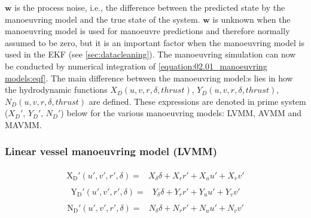 \(\mathbf{w}\) is the process noise, i.e., the difference between the predicted state by the manoeuvring model and the true
state of the system. \(\mathbf{w}\) is unknown when the manoeuvring model is used for manoeuvre predictions and therefore normally
assumed to be zero, but it is an important factor when the manoeuvring model is used in the EKF (see \autoref{sec:datacleaning}).
The manoeuvring simulation can now be conducted by numerical integration of \autoref{equation:02.01_manoeuvring models:eqf}. The main difference between the manoeuvring model:s lies in how the hydrodynamic functions \(X_D(u,v,r,\delta,thrust)\), \(Y_D(u,v,r,\delta,thrust)\), \(N_D(u,v,r,\delta,thrust)\) are defined. These expressions are denoted in prime system ($X_D'$, $Y_D'$, $N_D'$) below for the various manoeuvring models: LVMM, AVMM and MAVMM.

\subsubsection*{{\normalfont \textbf{Linear vessel manoeuvring model (LVMM) \cite{matusiak_dynamics_2021}}}}
\begin{equation}\label{equation:02.01_manoeuvring models:eqxlinear}
\begin{split}\begin{split}
\operatorname{X_{D}'}{\left(u',v',r',\delta\right)} = & X_{\delta} \delta + X_{r} r' + X_{u} u' + X_{v} v' 
\end{split}\end{split}
\end{equation}\begin{equation}\label{equation:02.01_manoeuvring models:eqylinear}
\begin{split}\begin{split}
\operatorname{Y_{D}'}{\left(u',v',r',\delta \right)} = & Y_{\delta} \delta + Y_{r} r' + Y_{u} u' + Y_{v} v' 
\end{split}\end{split}
\end{equation}\begin{equation}\label{equation:02.01_manoeuvring models:eqnlinear}
\begin{split}\begin{split}
\operatorname{N_{D}'}{\left(u',v',r',\delta \right)} = & N_{\delta} \delta + N_{r} r' + N_{u} u' + N_{v} v' 
\end{split}\end{split}
\end{equation}
\sphinxAtStartPar
